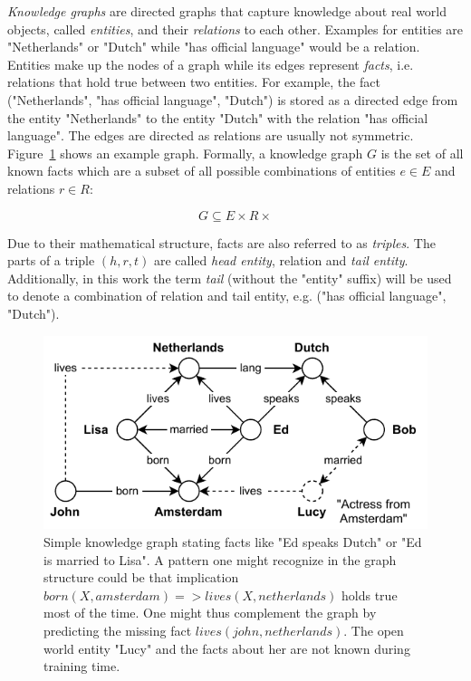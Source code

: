 \emph{Knowledge graphs} are directed graphs that capture knowledge about real world objects, called \emph{entities}, and their \emph{relations} to each other. Examples for entities are "Netherlands" or "Dutch" while "has official language" would be a relation. Entities make up the nodes of a graph while its edges represent \emph{facts}, i.e. relations that hold true between two entities. For example, the fact ("Netherlands", "has official language", "Dutch") is stored as a directed edge from the entity "Netherlands" to the entity "Dutch" with the relation "has official language". The edges are directed as relations are usually not symmetric. Figure~\ref{fig:1_introduction/example_kg} shows an example graph. Formally, a knowledge graph $G$ is the set of all known facts which are a subset of all possible combinations of entities $e \in E$ and relations $r \in R$:

\[
    G \subseteq E \times R \times
\]

Due to their mathematical structure, facts are also referred to as \emph{triples}. The parts of a triple $(h, r, t)$ are called \emph{head entity}, relation and \emph{tail entity}. Additionally, in this work the term \emph{tail} (without the "entity" suffix) will be used to denote a combination of relation and tail entity, e.g. ("has official language", "Dutch").

\begin{figure}[t]
    \centering
    \includegraphics{1_introduction/example_kg}
    \caption{ Simple knowledge graph stating facts like "Ed speaks Dutch" or "Ed is married to Lisa". A pattern one might recognize in the graph structure could be that implication $born(X, amsterdam) => lives(X, netherlands)$ holds true most of the time. One might thus complement the graph by predicting the missing fact $lives(john, netherlands)$. The open world entity "Lucy" and the facts about her are not known during training time.}
    \label{fig:1_introduction/example_kg}
\end{figure}

